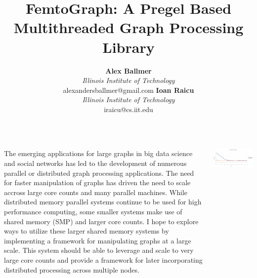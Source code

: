 \documentclass[35pt,landscape]{tikzposter}
\title{FemtoGraph: A Pregel Based Multithreaded
  Graph Processing Library}
\author{
  \textbf{Alex Ballmer}\\
  \textit{Illinois Institute of Technology}\\
  alexandersballmer@gmail.com
  \textbf{Ioan Raicu}\\
  \textit{Illinois Institute of Technology}\\
  iraicu@cs.iit.edu
}
\begin{document}
\maketitle

\begin{columns}
     {


  The emerging applications for large graphs in big data science and social networks has led to the development of numerous parallel or distributed graph processing applications. The need for faster manipulation of graphs has driven the need to scale accross large core counts and many parallel machines. While distributed memory parallel systems continue to be used for high performance computing, some smaller systems make use of shared memory (SMP) and larger core counts. I hope to explore ways to utilize these larger shared memory systems by implementing a framework for manipulating graphs at a large scale. This system should be able to leverage and scale to very large core counts and provide a framework for later incorporating distributed processing across multiple nodes.
}

    
     {
      \setcounter{figurecounter}{98}
      \begin{tikzfigure}
        \includegraphics[width=0.95\linewidth]{vs.png}
        \end{tikzfigure}


      }

    
\end{columns}
\end{document}
